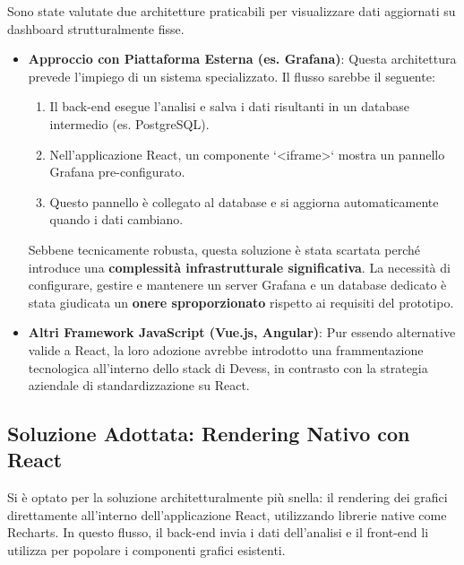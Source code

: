 Sono state valutate due architetture praticabili per visualizzare dati aggiornati su dashboard strutturalmente fisse.

\begin{itemize}
    \item \textbf{Approccio con Piattaforma Esterna (es. Grafana)}: Questa architettura prevede l'impiego di un sistema specializzato. Il flusso sarebbe il seguente: 
    \begin{enumerate}
        \item Il back-end esegue l'analisi e salva i dati risultanti in un database intermedio (es. PostgreSQL).
        \item Nell'applicazione React, un componente `<iframe>` mostra un pannello Grafana pre-configurato.
        \item Questo pannello è collegato al database e si aggiorna automaticamente quando i dati cambiano.
    \end{enumerate}
    Sebbene tecnicamente robusta, questa soluzione è stata scartata perché introduce una \textbf{complessità infrastrutturale significativa}. La necessità di configurare, gestire e mantenere un server Grafana e un database dedicato è stata giudicata un \textbf{onere sproporzionato} rispetto ai requisiti del prototipo.
    
    \item \textbf{Altri Framework JavaScript (Vue.js, Angular)}: Pur essendo alternative valide a React, la loro adozione avrebbe introdotto una frammentazione tecnologica all'interno dello stack di Devess, in contrasto con la strategia aziendale di standardizzazione su React.
\end{itemize}

\subsection{Soluzione Adottata: Rendering Nativo con React}
Si è optato per la soluzione architetturalmente più snella: il rendering dei grafici direttamente all'interno dell'applicazione React, utilizzando librerie native come Recharts. In questo flusso, il back-end invia i dati dell'analisi e il front-end li utilizza per popolare i componenti grafici esistenti.

